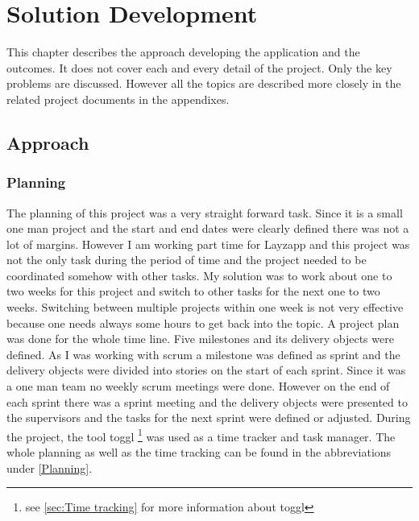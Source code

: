 
\chapter{Solution Development} %

\label{Solution Development} %



This chapter describes the approach developing the application and the outcomes. It does not cover each and every detail of the project. Only the key problems are discussed. However all the topics are described more closely in the related project documents in the appendixes.

\section{Approach}

\subsection{Planning}

The planning of this project was a very straight forward task. Since it is a small one man project and the start and end dates were clearly defined there was not a lot of margins.  However I am working part time for Layzapp and this project was not the only task during the period of time and the project needed to be coordinated somehow with other tasks. My solution was to work about one to two weeks for this project and switch to other tasks for the next one to two weeks. Switching between multiple projects within one week is not very effective because one needs always some hours to get back into the topic. \linebreak
A project plan was done for the whole time line. Five milestones and its delivery objects were defined. As I was working with scrum a milestone was defined as sprint and the delivery objects were divided into stories on the start of each sprint. Since it was a one man team no weekly scrum meetings were done. However on the end of each sprint there was a sprint meeting and the delivery objects were presented to the supervisors and the tasks for the next sprint were defined or adjusted. During the project, the tool toggl \footnote{see \ref{sec:Time tracking}  for more information about toggl} was used as a time tracker and task manager. The whole planning as well as the time tracking can be found in the abbreviations under \ref{Planning}.

